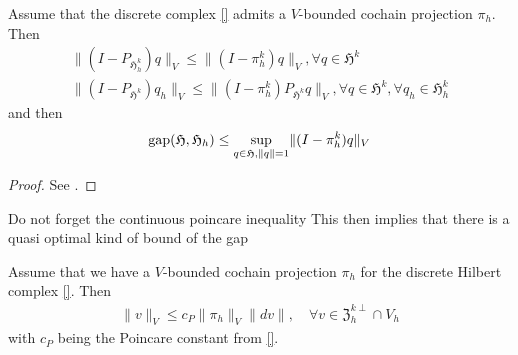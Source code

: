 \documentclass[../master_thesis.tex]{subfiles}
\begin{document}
\begin{proposition}
    Assume that the discrete complex \ref{} admits a $V$-bounded cochain projection
    $\pi_h$. Then
    \begin{align*}
        \lVert (I - P_{\mathfrak{H}^k_h}) q \rVert _V \leq \lVert (I - \pi_h^k) q \rVert _V, 
            \forall q \in \mathfrak{H}^k 
        \\ \lVert (I - P_{\mathfrak{H}^k}) q_h \rVert _V 
        \leq \lVert (I - \pi_h^k)P_{\mathfrak{H}^k} q \rVert _V, \forall q \in \mathfrak{H}^k, 
                \forall q_h \in \mathfrak{H}^k_h 
    \end{align*}
    and then 
    \begin{align*}
        \operatorname{gap} (\mathfrak{H}, \mathfrak{H}_h) 
        \leq \sup_{q \in \mathfrak{H}, \lVert q \rVert = 1} \lVert (I - \pi_h^k) q \rVert_V
    \end{align*}
\end{proposition}
\begin{proof}
    See \cite[Thm.\,5.2]{arnold}. 
\end{proof}
{\color{red} Do not forget the continuous poincare inequality} This then implies 
that there is a quasi optimal kind of bound of the gap
\begin{proposition}
    Assume that we have a $V$-bounded cochain projection $\pi_h$ for 
    the discrete Hilbert complex \ref{}. Then 
    \begin{align*}
        \lVert v \rVert _V \leq c_P \lVert \pi_h \rVert _V \lVert dv \rVert, 
            \quad \forall v \in \mathfrak{Z}_h^{k\perp}\cap V_h
    \end{align*}
    with $c_P$ being the Poincare constant from \ref{}.
\end{proposition}
\end{document}
